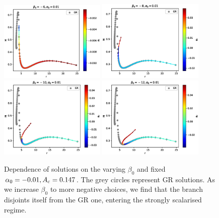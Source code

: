 \documentclass[12pt]{article}
\numberwithin{equation}{section}
\begin{document}
\begin{figure}
    \centering
    \includegraphics[width=0.45\textwidth, clip=True]{MofR_beta6.eps} \includegraphics[width=0.45\textwidth, clip=True]{MofR_beta8.eps} \\
    \includegraphics[width=0.45\textwidth, clip=True]{MofR_beta10.eps} \includegraphics[width=0.45\textwidth, clip=True]{MofR_beta12.eps} \\
    \caption{Dependence of solutions on the varying $\beta_0$ and fixed $\alpha_0 = -0.01, A_{\rm c} = 0.147$. The grey circles represent GR solutions. As we increase $\beta_0$ to more negative choices, we find that the branch disjoints itself from the GR one, entering the strongly scalarised regime.}
    \label{fig:MofR_betavar}
\end{figure}
\end{document}
